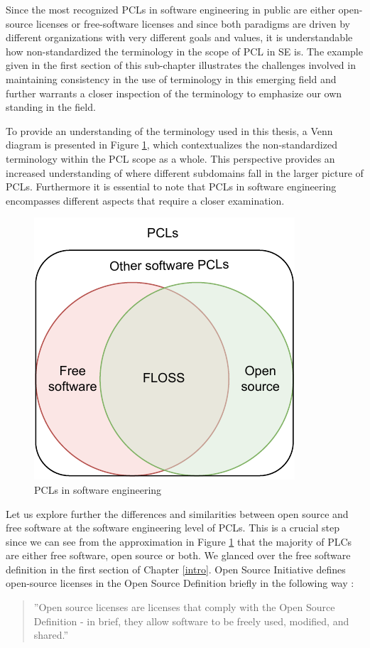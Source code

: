 Since the most recognized PCLs in software engineering in public are either open-source licenses or free-software licenses and since both paradigms are driven by different organizations with very different goals and values, it is understandable how non-standardized the terminology in the scope of PCL in SE is. The example given in the first section of this sub-chapter illustrates the challenges involved in maintaining consistency in the use of terminology in this emerging field and further warrants a closer inspection of the terminology to emphasize our own standing in the field.

To provide an understanding of the terminology used in this thesis, a Venn diagram is presented in Figure \ref{fig:terms}, which contextualizes the non-standardized terminology within the PCL scope as a whole. This perspective provides an increased understanding of where different subdomains fall in the larger picture of PCLs. Furthermore it is essential to note that PCLs in software engineering encompasses different aspects that require a closer examination.

\begin{figure}[t]
	\centering
	\includegraphics[scale=1.5]{figures/terms-diagram.pdf}
	\caption{PCLs in software engineering}
	\label{fig:terms}
\end{figure}

Let us explore further the differences and similarities between open source and free software at the software engineering level of PCLs. This is a crucial step since we can see from the approximation in Figure \ref{fig:terms} that the majority of PLCs are either free software, open source or both. We glanced over the free software definition in the first section of Chapter \ref{intro}. Open Source Initiative defines open-source licenses in the Open Source Definition briefly in the following way \citep{osi:licenselist}:
\begin{quote}
	''Open source licenses are licenses that comply with the Open Source Definition - in brief, they allow software to be freely used, modified, and shared.''
\end{quote}

